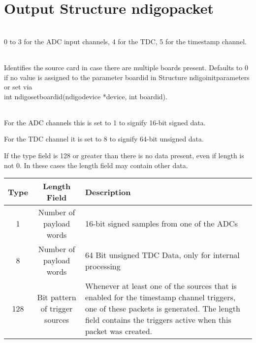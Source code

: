 \section{Output Structure ndigo\tu packet}

    \\
    0 to 3 for the ADC input channels, 4 for the TDC, 5 for the timestamp channel.\par

    \\
    Identifies the source card in case there are multiple boards present. Defaults to 0 if no value is assigned to the parameter \textsf{board\tu id} in Structure \textsf{ndigo\tu init\tu parameters} or set via\\ \textsf{int ndigo\tu set\tu board\tu id(ndigo\tu device *device, int board\tu id)}.\par

    \\
    For the ADC channels this is set to 1 to signify 16-bit signed data.\par

    For the TDC channel it is set to 8 to signify 64-bit unsigned data.\par

    If the type field is 128 or greater than there is no data present, even if length is not 0. In these cases the length field may contain other data.\par

    \noindent
    \begin{small}
    \begin{tabular}{|c|c|p{}|}
        \hline
        Type & Length Field & Description\\\hline
        \hline
        1 & Number of payload words & 16-bit signed samples from one of the ADCs\\\hline
        8 & Number of payload words & 64 Bit unsigned TDC Data, only for internal processing\\\hline
        128 & Bit pattern of trigger sources & Whenever at least one of the sources that is enabled for the timestamp channel triggers, one of these packets is generated. The length field contains the triggers active when this packet was created.\\\hline
    \end{tabular}
    \end{small}

